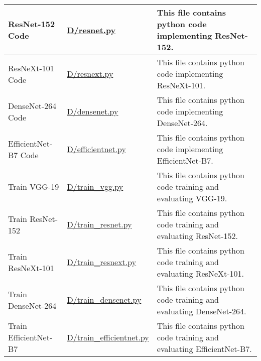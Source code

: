 \begin{xltabular}{\textwidth}{llX}
	ResNet-152 Code & \url{D/resnet.py} & This file contains python code implementing ResNet-152.\\\midrule
	ResNeXt-101 Code & \url{D/resnext.py} & This file contains python code implementing ResNeXt-101.\\\midrule
	DenseNet-264 Code & \url{D/densenet.py} & This file contains python code implementing Dense\-Net-264.\\\midrule
	EfficientNet-B7 Code & \url{D/efficientnet.py} & This file contains python code implementing Efficient\-Net-B7.\\\midrule
	Train VGG-19 & \url{D/train_vgg.py} & This file contains python code training and evaluating VGG-19.\\\midrule
	Train ResNet-152 & \url{D/train_resnet.py} & This file contains python code training and evaluating ResNet-152.\\\midrule
	Train ResNeXt-101 & \url{D/train_resnext.py} & This file contains python code training and evaluating ResNeXt-101.\\\midrule
	Train DenseNet-264 & \url{D/train_densenet.py} & This file contains python code training and evaluating DenseNet-264.\\\midrule
	Train EfficientNet-B7 & \url{D/train_efficientnet.py} & This file contains python code training and evaluating EfficientNet-B7.
	\\\bottomrule
\end{xltabular}